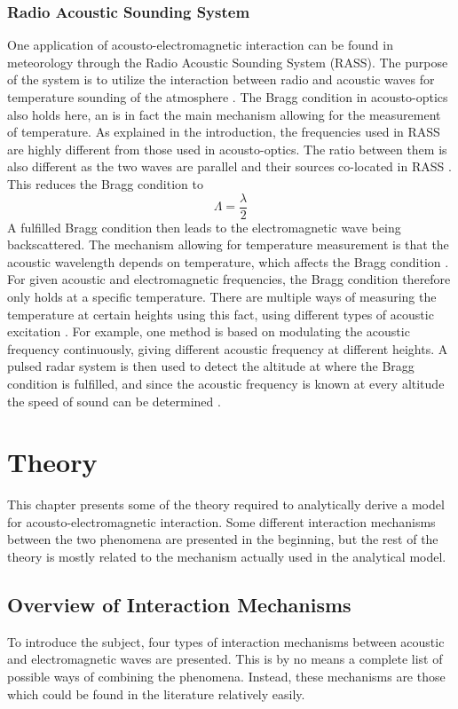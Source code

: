 \documentclass[11pt,twoside]{eitExjobb}
\begin{document}
	\subsection{Radio Acoustic Sounding System}
	One application of acousto-electromagnetic interaction can be found in meteorology through the Radio Acoustic Sounding System (RASS). The purpose of the system is to utilize the interaction between radio and acoustic waves for temperature sounding of the atmosphere \cite{May1990}. The Bragg condition in acousto-optics also holds here, an is in fact the main mechanism allowing for the measurement of temperature. As explained in the introduction, the frequencies used in RASS are highly different from those used in acousto-optics. The ratio between them is also different as the two waves are parallel and their sources co-located in RASS \cite{Marshall1972}. This reduces the Bragg condition to \cite{Marshall1972}
	\begin{equation*}
		\Lambda = \frac{\lambda}{2}
	\end{equation*}
	A fulfilled Bragg condition then leads to the electromagnetic wave being backscattered. The mechanism allowing for temperature measurement is that the acoustic wavelength depends on temperature, which affects the Bragg condition \cite{Marshall1972}. For given acoustic and electromagnetic frequencies, the Bragg condition therefore only holds at a specific temperature. There are multiple ways of measuring the temperature at certain heights using this fact, using different types of acoustic excitation \cite{May1990}. For example, one method is based on modulating the acoustic frequency continuously, giving different acoustic frequency at different heights. A pulsed radar system is then used to detect the altitude at where the Bragg condition is fulfilled, and since the acoustic frequency is known at every altitude the speed of sound can be determined \cite{May1990}.
	
	\chapter{Theory \label{ch:theory}}
	This chapter presents some of the theory required to analytically derive a model for acousto-electromagnetic interaction. Some different interaction mechanisms between the two phenomena are presented in the beginning, but the rest of the theory is mostly related to the mechanism actually used in the analytical model.
	
	\section{Overview of Interaction Mechanisms}
	To introduce the subject, four types of interaction mechanisms between acoustic and electromagnetic waves are presented. This is by no means a complete list of possible ways of combining the phenomena. Instead, these mechanisms are those which could be found in the literature relatively easily.
	
\end{document}
